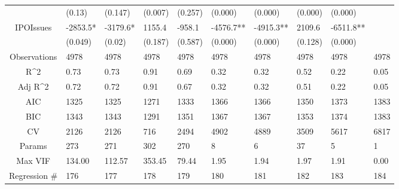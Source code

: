 \documentclass{article}
\begin{document}
\begin{table}[H]
\begin{tabular}{|clllllllll|}
   & (0.13) & (0.147) & (0.007) & (0.257) & (0.000) & (0.000) & (0.000) & (0.000) &  \\ 
  IPOIssues & -2853.5* & -3179.6* & 1155.4 & -958.1 & -4576.7** & -4915.3** & 2109.6 & -6511.8** &  \\ 
   & (0.049) & (0.02) & (0.187) & (0.587) & (0.000) & (0.000) & (0.128) & (0.000) &  \\ 
  \hline 
 Observations & 4978 & 4978 & 4978 & 4978 & 4978 & 4978 & 4978 & 4978 & 4978 \\ 
  R^2 & 0.73 & 0.73 & 0.91 & 0.69 & 0.32 & 0.32 & 0.52 & 0.22 & 0.05 \\ 
  Adj R^2 & 0.72 & 0.72 & 0.91 & 0.67 & 0.32 & 0.32 & 0.51 & 0.22 & 0.05 \\ 
  AIC & 1325 & 1325 & 1271 & 1333 & 1366 & 1366 & 1350 & 1373 & 1383 \\ 
  BIC & 1343 & 1343 & 1291 & 1351 & 1367 & 1367 & 1353 & 1374 & 1383 \\ 
  CV & 2126 & 2126 & 716 & 2494 & 4902 & 4889 & 3509 & 5617 & 6817 \\ 
  Params & 273 & 271 & 302 & 270 & 8 & 6 & 37 & 5 & 1 \\ 
  Max VIF & 134.00 & 112.57 & 353.45 & 79.44 & 1.95 & 1.94 & 1.97 & 1.91 & 0.00 \\ 
  Regression \# & 176 & 177 & 178 & 179 & 180 & 181 & 182 & 183 & 184 \\ 
   \hline
\end{tabular}
 
\end{table}
\end{document}
